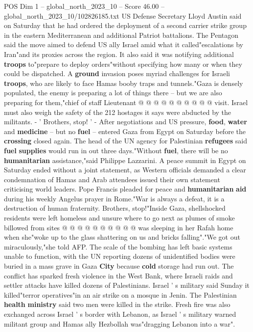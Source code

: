 \begin{textsample}{POS Dim 1 – global\_north\_2023\_10 – Score 46.00 – global\_north\_2023\_10/102826185.txt}
US Defense Secretary Lloyd Austin said on Saturday that he had ordered the deployment of a second carrier strike group in the eastern Mediterranean and additional Patriot battalions.
The Pentagon said the move aimed to defend US ally Israel amid what it called"escalations by Iran"and its proxies across the region.
It also said it was notifying additional \textbf{troops} to"prepare to deploy orders"without specifying how many or when they could be dispatched.
A \textbf{ground} invasion poses myriad challenges for Israeli \textbf{troops}, who are likely to face Hamas booby traps and tunnels."Gaza is densely populated, the enemy is preparing a lot of things there -- but we are also preparing for them,"chief of staff Lieutenant @ @ @ @ @ @ @ @ @ @ visit.
Israel must also weigh the safety of the 212 hostages it says were abducted by the militants. - ' Brothers, stop! ' - After negotiations and US pressure, \textbf{food}, \textbf{water} and \textbf{medicine} -- but no \textbf{fuel} -- entered Gaza from Egypt on Saturday before the \textbf{crossing} closed again.
The head of the UN agency for Palestinian \textbf{refugees} said \textbf{fuel} \textbf{supplies} would run in out three days."Without \textbf{fuel}, there will be no \textbf{humanitarian} assistance,"said Philippe Lazzarini.
A peace summit in Egypt on Saturday ended without a joint statement, as Western officials demanded a clear condemnation of Hamas and Arab attendees issued their own statement criticising world leaders.
Pope Francis pleaded for peace and \textbf{humanitarian} \textbf{aid} during his weekly Angelus prayer in Rome."War is always a defeat, it is a destruction of human fraternity.
Brothers, stop!"Inside Gaza, shellshocked residents were left homeless and unsure where to go next as plumes of smoke billowed from sites @ @ @ @ @ @ @ @ @ @ was sleeping in her Rafah home when she"woke up to the glass shattering on us and bricks falling"."We got out miraculously,"she told AFP.
The scale of the bombing has left basic systems unable to function, with the UN reporting dozens of unidentified bodies were buried in a mass grave in Gaza \textbf{City} because \textbf{cold} storage had run out.
The conflict has sparked fresh violence in the West Bank, where Israeli raids and settler attacks have killed dozens of Palestinians.
Israel ' s military said Sunday it killed"terror operatives"in an air strike on a mosque in Jenin.
The Palestinian \textbf{health} \textbf{ministry} said two men were killed in the strike.
Fresh fire was also exchanged across Israel ' s border with Lebanon, as Israel ' s military warned militant group and Hamas ally Hezbollah was"dragging Lebanon into a war".

\end{textsample}

